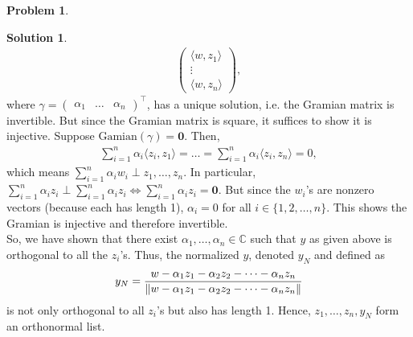 \documentclass{article}
\theoremstyle{definition}
\newtheorem*{prob*}{Problem}
\newtheorem*{sln*}{Solution}
\newcommand{\la}{\langle}
\newcommand{\ra}{\rangle}
\begin{document}
\begin{prob*}
\begin{enumerate}
\begin{sln*}
\begin{align*}
\begin{pmatrix}
			 \la w,z_1 \ra\\
			 \vdots\\
			 \la w,z_n \ra
			 \end{pmatrix},
			 \end{align*}
			 where $\gamma = \begin{pmatrix}
			 \alpha_1&\dots&\alpha_n
			 \end{pmatrix}^\top$, has a unique solution, i.e. the Gramian matrix is invertible. But since the Gramian matrix is square, it suffices to show it is injective. Suppose $\text{Gamian}(\gamma) = \mathbf{0}$. Then,
			 \begin{align*}
			 \sum^n_{i=1}\alpha_i \la z_i,z_1 \ra = \dots = \sum^n_{i=1}\alpha_i \la z_i,z_n \ra = 0,
			 \end{align*}
			 which means $\sum^n_{i=1}\alpha_i w_i \perp z_1,\dots, z_n$. In particular, $\sum^n_{i=1}\alpha_i z_i \perp \sum^n_{i=1}\alpha_i z_i \iff \sum^n_{i=1}\alpha_i z_i = \mathbf{0}$. But since the $w_i$'s are nonzero vectors (because each has length 1), $\alpha_i = 0$ for all $i \in  \{1,2,\dots,n \}$. This shows the Gramian is injective and therefore invertible. \\
			 
			 So, we have shown that there exist $\alpha_1,\dots,\alpha_n \in \mathbb{C}$ such that $y$ as given above is orthogonal to all the $z_i$'s. Thus, the normalized $y$, denoted $y_N$ and defined as
			 \begin{align*}
			 y_N = \frac{w - \alpha_1 z_1 - \alpha_2 z_2 - \dots - \alpha_n z_n}{\norm{w - \alpha_1 z_1 - \alpha_2 z_2 - \dots - \alpha_n z_n}}
			 \end{align*}
			 is not only orthogonal to all $z_i$'s but also has length 1. Hence, $z_1,\dots,z_n,y_N$ form an orthonormal list. \\
			 

\end{sln*}
\end{enumerate}
\end{prob*}
\end{document}
